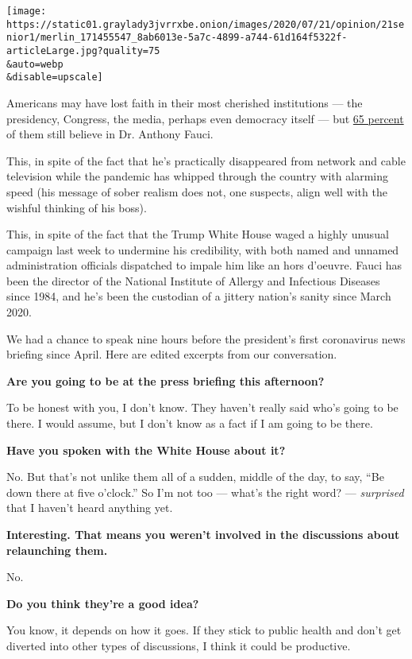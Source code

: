 \texttt{[image: https://static01.graylady3jvrrxbe.onion/images/2020/07/21/opinion/21senior1/merlin\_171455547\_8ab6013e-5a7c-4899-a744-61d164f5322f-articleLarge.jpg?quality=75\\\&auto=webp\\\&disable=upscale]}

Americans may have lost faith in their most cherished institutions ---
the presidency, Congress, the media, perhaps even democracy itself ---
but
\href{https://www.nytimes3xbfgragh.onion/2020/07/17/us/politics/fauci-trump-coronavirus.html}{65
percent} of them still believe in Dr. Anthony Fauci.

This, in spite of the fact that he's practically disappeared from
network and cable television while the pandemic has whipped through the
country with alarming speed (his message of sober realism does not, one
suspects, align well with the wishful thinking of his boss).

This, in spite of the fact that the Trump White House waged a highly
unusual campaign last week to undermine his credibility, with both named
and unnamed administration officials dispatched to impale him like an
hors d'oeuvre. Fauci has been the director of the National Institute of
Allergy and Infectious Diseases since 1984, and he's been the custodian
of a jittery nation's sanity since March 2020.

We had a chance to speak nine hours before the president's first
coronavirus news briefing since April. Here are edited excerpts from our
conversation.

\textbf{Are you going to be at the press briefing this afternoon?}

To be honest with you, I don't know. They haven't really said who's
going to be there. I would assume, but I don't know as a fact if I am
going to be there.

\textbf{Have you spoken with the White House about it?}

No. But that's not unlike them all of a sudden, middle of the day, to
say, ``Be down there at five o'clock.'' So I'm not too --- what's the
right word? --- \emph{surprised} that I haven't heard anything yet.

\textbf{Interesting. That means you weren't involved in the discussions
about relaunching them.}

No.

\textbf{Do you think they're a good idea?}

You know, it depends on how it goes. If they stick to public health and
don't get diverted into other types of discussions, I think it could be
productive.

